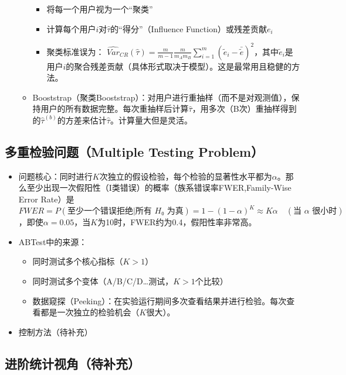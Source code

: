 \documentclass[
  letterpaper,
  DIV=11,
  numbers=noendperiod]{scrreprt}
\begin{document}
\begin{itemize}
\begin{itemize}
    \begin{itemize}
    \item
      将每一个用户视为一个``聚类''
    \item
      计算每个用户\(i\)对\(\hat{\tau}\)的``得分''（Influence
      Function）或残差贡献\(e_i\)
    \item
      聚类标准误为：
      \(\widehat{Var}_{CR}(\hat{τ}) = \frac{m}{m-1} \frac{m}{m_A m_B} \sum_{i=1}^m (\tilde{e}_i - \bar{\tilde{e}})^2\)，其中\(\tilde{e}_i\)是用户\(i\)的聚合残差贡献（具体形式取决于模型）。这是最常用且稳健的方法。
    \end{itemize}
  \item
    Booststrap（聚类Booststrap）：对用户进行重抽样（而不是对观测值），保持用户的所有数据完整。每次重抽样后计算\(\hat{\tau}\)，用多次（B次）重抽样得到的\(\hat{\tau}^{(b)}\)的方差来估计\(\hat{\tau}\)。计算量大但是灵活。
  \end{itemize}
\end{itemize}

\subsection{多重检验问题（Multiple Testing
Problem）}\label{ux591aux91cdux68c0ux9a8cux95eeux9898multiple-testing-problem}

\begin{itemize}
\item
  问题核心：同时进行\(K\)次独立的假设检验，每个检验的显著性水平都为\(\alpha\)。那么至少出现一次假阳性（I类错误）的概率（族系错误率FWER,Family-Wise
  Error
  Rate）是\[FWER = P(\text{至少一个错误拒绝} | \text{所有 } H₀ \text{ 为真}) = 1 - (1 - α)^K ≈ Kα \quad (\text{当 } α \text{ 很小时})\]，即使\(\alpha = 0.05\)，当\(K\)为10时，FWER约为0.4，假阳性率非常高。
\item
  ABTest中的来源：

  \begin{itemize}
  \item
    同时测试多个核心指标（\(K>1\)）
  \item
    同时测试多个变体（A/B/C/D\ldots 测试，\(K>1\)个比较）
  \item
    数据窥探（Peeking）：在实验运行期间多次查看结果并进行检验。每次查看都是一次独立的检验机会（\(K\)很大）。
  \end{itemize}
\item
  控制方法（待补充）
\end{itemize}

\subsection{进阶统计视角（待补充）}\label{ux8fdbux9636ux7edfux8ba1ux89c6ux89d2ux5f85ux8865ux5145}
\end{document}
